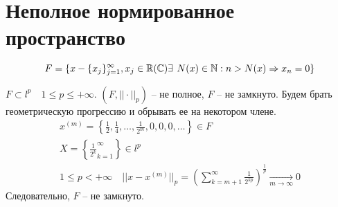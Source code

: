 \documentclass[document]{subfiles}
\begin{document}
    \section{Неполное нормированное пространство}
    \begin{definition}
        \[F = \{ x - \{x_j\}_{j=1}^\infty, x_j \in \bR (\bC) \exists \, N(x) \in \bN : n > N(x) \Rightarrow x_n = 0 \} \]
    \end{definition}
$F \subset l^p \quad 1 \leq p \leq + \infty$.
$(F, || \cdot ||_p) $ -- не полное, $F$ -- не замкнуто.
Будем брать геометрическую прогрессию и обрывать ее на некотором члене.
\begin{gather*}
    x^{(m)} = \left\{ \frac{1}{2}, \frac{1}{4}, \ldots, \frac{1}{2^m}, 0, 0, 0, \ldots \right\} \in F \\
    X = \left\{ \frac{1}{2^k}^\infty_{k=1} \right\} \in l^p \\
    1 \leq p < + \infty \quad ||x - x^{(m)}||_p = \left( \sum^\infty_{k=m+1} \frac{1}{2^{kp}} \right)^{\frac{1}{p}} \underset{m \to \infty}{\rightarrow} 0
\end{gather*}
Следовательно, $F$ -- не замкнуто.
\end{document}
